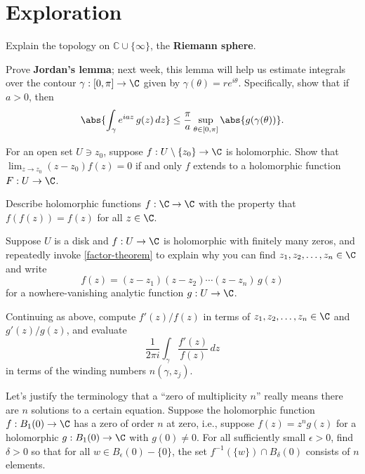 \documentclass{homework}
\begin{document}
\section{Exploration}

\begin{problem}
  Explain the topology on $\mathbb{C} \cup \{ \infty \}$, the \textbf{Riemann sphere}.
\end{problem}

\begin{problem}\label{jordans-lemma}
  Prove \textbf{Jordan's lemma}; next week, this lemma will help us estimate integrals over the contour $\gamma : [0,\pi] \to \C$ given by $\gamma(\theta) = re^{i\theta}$.
  Specifically, show that if $a > 0$, then
  \[
    \abs{\int_\gamma e^{iaz} \, g(z) \, dz } \leq \frac{\pi}{a} \sup_{\theta \in [0,\pi]} \abs{g(\gamma(\theta))}.
    \]
\end{problem}

\begin{problem}\label{riemann-removable-singularity}
  For an open set $U \ni z_0$, suppose
  $f : U \setminus \{z_0\} \to \C$ is holomorphic.  Show that
  $\lim_{z\to z_0} (z-z_0)f(z)=0$ if and only $f$ extends to a
  holomorphic function $F : U \to \C$.
\end{problem}

\begin{problem}\label{idempotent-entire}Describe holomorphic functions
  $f : \C \to \C$ with the property that $f(f(z)) = f(z)$ for all
  $z \in \C$.
\end{problem}

\begin{problem}
  Suppose $U$ is a disk and $f : U \to \C$ is holomorphic with
  finitely many zeros, and repeatedly invoke \ref{factor-theorem} to
  explain why you can find $z_1,z_2,\ldots,z_n \in \C$ and write
  \[
    f(z) = (z-z_1)(z-z_2) \cdots (z-z_n) \, g(z)
  \]
  for a nowhere-vanishing analytic function $g : U \to \C$.
\end{problem}

\begin{problem}\label{argument-principle-zeros}
  Continuing as above, compute $f'(z)/f(z)$ in terms of $z_1,z_2,\ldots,z_n \in \C$ and $g'(z)/g(z)$, and evaluate
  \[
    \frac{1}{2\pi i} \int_\gamma \frac{f'(z)}{f(z)} \, dz
  \]
  in terms of the winding numbers $n(\gamma,z_j)$.
\end{problem}

\begin{problem}
  Let's justify the terminology that a ``zero of multiplicity $n$''
  really means there are $n$ solutions to a certain equation.  Suppose
  the holomorphic function $f : B_1(0) \to \C$ has a zero of order $n$
  at zero, i.e., suppose $f(z) = z^n g(z)$ for a holomorphic
  $g : B_1(0) \to \C$ with $g(0) \neq 0$.  For all sufficiently small
  $\epsilon > 0$, find $\delta > 0$ so that for all
  $w \in B_\epsilon(0) - \{0\}$, the set
  $f^{-1}(\{w\}) \cap B_\delta(0)$ consists of $n$ elements.
\end{problem}
\end{document}
